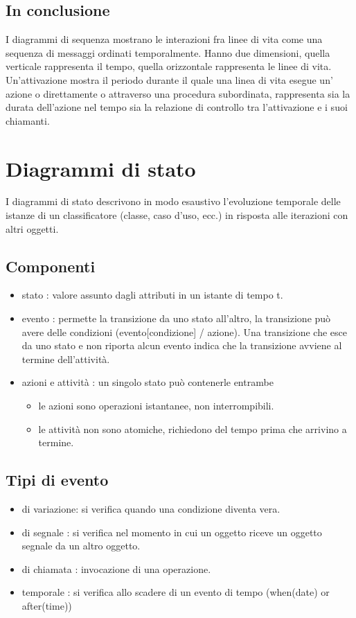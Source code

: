 \documentclass[a4paper,12pt]{report}
\begin{document}
	\subsection{In conclusione}
	I diagrammi di sequenza mostrano le interazioni fra linee di vita come una sequenza di messaggi ordinati temporalmente. Hanno due dimensioni, quella verticale rappresenta il tempo, quella orizzontale rappresenta le linee di vita. Un'attivazione mostra il periodo durante il quale una linea di vita esegue  un' azione o direttamente o attraverso una procedura subordinata, rappresenta sia la durata dell'azione nel tempo sia la relazione di controllo tra l'attivazione e i suoi chiamanti.
	\section{Diagrammi di stato}
	I diagrammi di stato descrivono in modo esaustivo l'evoluzione temporale delle  istanze di un classificatore (classe, caso d'uso, ecc.) in risposta alle iterazioni con altri oggetti.
	\subsection{Componenti}
	\begin{itemize}
		\item stato : valore assunto dagli attributi in un istante di tempo t.
		\item evento : permette la transizione da uno stato all'altro, la transizione può avere delle condizioni (evento[condizione] / azione). Una transizione che esce da uno stato e non riporta alcun evento indica che la transizione avviene al termine dell'attività.
		\item azioni e attività : un singolo stato può contenerle entrambe
		\begin{itemize}
			\item le azioni sono operazioni istantanee, non interrompibili.
			\item le attività non sono atomiche, richiedono del tempo prima che arrivino a termine.
		\end{itemize}
	\end{itemize}
	\subsection{Tipi di evento}
	\begin{itemize}
		\item di variazione: si verifica quando una condizione diventa vera.
		\item di segnale : si verifica nel momento in cui un oggetto riceve un oggetto segnale da un altro oggetto.
		\item di chiamata : invocazione di una operazione.
		\item temporale : si verifica allo scadere di un evento di tempo (when(date) or after(time))
	\end{itemize}
\end{document}
